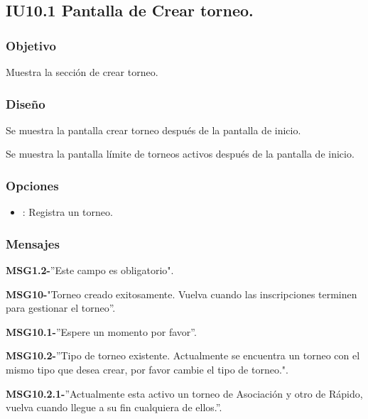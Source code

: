 \subsection{IU10.1 Pantalla de Crear torneo.}

\subsubsection{Objetivo}
	Muestra la sección de crear torneo.

\subsubsection{Diseño}
Se muestra la pantalla crear torneo después de la pantalla de inicio.

 Se muestra la pantalla límite de torneos activos después de la pantalla de inicio.

\subsubsection{Opciones}
\begin{itemize}
	\item {}: Registra un torneo.

\end{itemize}

\subsubsection{Mensajes}
	\begin{Citemize}
		\item {\bf MSG1.2-}''Este campo es obligatorio".
		\item {\bf MSG10-}"Torneo creado exitosamente. Vuelva cuando las inscripciones terminen para gestionar el torneo''.
		\item {\bf MSG10.1-}''Espere un momento por favor''.
		\item {\bf MSG10.2-}''Tipo de torneo existente. Actualmente se encuentra un torneo con el mismo tipo que desea crear, por favor cambie el tipo de torneo.".
		\item {\bf MSG10.2.1-}''Actualmente esta activo un torneo de Asociación y otro de Rápido, vuelva cuando llegue a su fin cualquiera de ellos.''.
\end{Citemize}